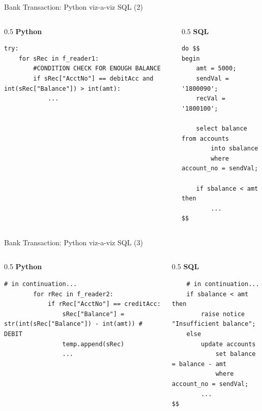 \documentclass[aspectratio=169, xcolor=dvipsnames]{beamer}
\begin{document}
\begin{frame}[fragile]{Bank Transaction: Python viz-a-viz SQL (2)}
    \begin{columns}[T]
        \begin{column}{0.5\textwidth}
            \textbf{Python}
            \begin{verbatim}
try:
    for sRec in f_reader1: 
        #CONDITION CHECK FOR ENOUGH BALANCE
        if sRec["AcctNo"] == debitAcc and int(sRec["Balance"]) > int(amt):
            ...
            \end{verbatim}
        \end{column}
        \begin{column}{0.5\textwidth}
            \textbf{SQL}
            \begin{verbatim}
do $$
begin
    amt = 5000;
    sendVal = '1800090';
    recVal = '1800100';
    
    select balance from accounts 
        into sbalance 
        where account_no = sendVal;
        
    if sbalance < amt then
        ...
$$
            \end{verbatim}
        \end{column}
    \end{columns}
\end{frame}

\begin{frame}[fragile]{Bank Transaction: Python viz-a-viz SQL (3)}
    \begin{columns}[T]
        \begin{column}{0.5\textwidth}
            \textbf{Python}
            \begin{verbatim}
# in continuation...
        for rRec in f_reader2:
            if rRec["AcctNo"] == creditAcc:
                sRec["Balance"] = str(int(sRec["Balance"]) - int(amt)) # DEBIT
                temp.append(sRec)
                ...
            \end{verbatim}
        \end{column}
        \begin{column}{0.5\textwidth}
            \textbf{SQL}
            \begin{verbatim}
    # in continuation...
    if sbalance < amt then
        raise notice "Insufficient balance";
    else
        update accounts 
            set balance = balance - amt 
            where account_no = sendVal;
        ...
$$
            \end{verbatim}
        \end{column}
    \end{columns}
\end{frame}
\end{document}
